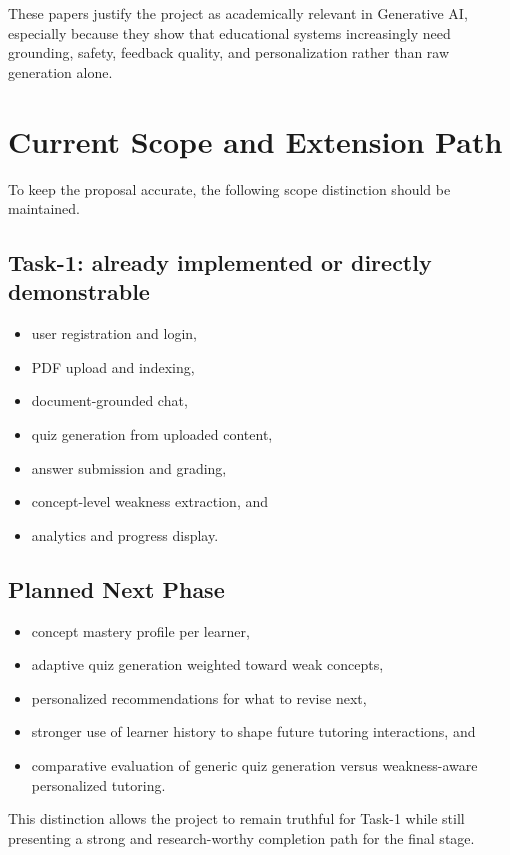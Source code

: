 \documentclass[11pt,a4paper]{article}
\begin{document}
These papers justify the project as academically relevant in Generative AI, especially because they show that educational systems increasingly need grounding, safety, feedback quality, and personalization rather than raw generation alone.

\section{Current Scope and Extension Path}
To keep the proposal accurate, the following scope distinction should be maintained.

\subsection{Task-1: already implemented or directly demonstrable}
\begin{itemize}
    \item user registration and login,
    \item PDF upload and indexing,
    \item document-grounded chat,
    \item quiz generation from uploaded content,
    \item answer submission and grading,
    \item concept-level weakness extraction, and
    \item analytics and progress display.
\end{itemize}

\subsection{Planned Next Phase}
\begin{itemize}
    \item concept mastery profile per learner,
    \item adaptive quiz generation weighted toward weak concepts,
    \item personalized recommendations for what to revise next,
    \item stronger use of learner history to shape future tutoring interactions, and
    \item comparative evaluation of generic quiz generation versus weakness-aware personalized tutoring.
\end{itemize}

This distinction allows the project to remain truthful for Task-1 while still presenting a strong and research-worthy completion path for the final stage.
\end{document}
